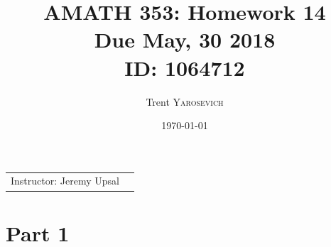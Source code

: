 \documentclass{article}
\title{AMATH 353: Homework 14 \\Due May, 30 2018 \\ ID: 1064712} %
\author{Trent \textsc{Yarosevich}} %
\date{\today} %
\begin{document}
\maketitle %
\setlength\parindent{1cm}

\begin{center}
\begin{tabular}{l r}
Instructor: Jeremy Upsal %
\end{tabular}
\end{center}


\section*{Part 1}
\end{document}
